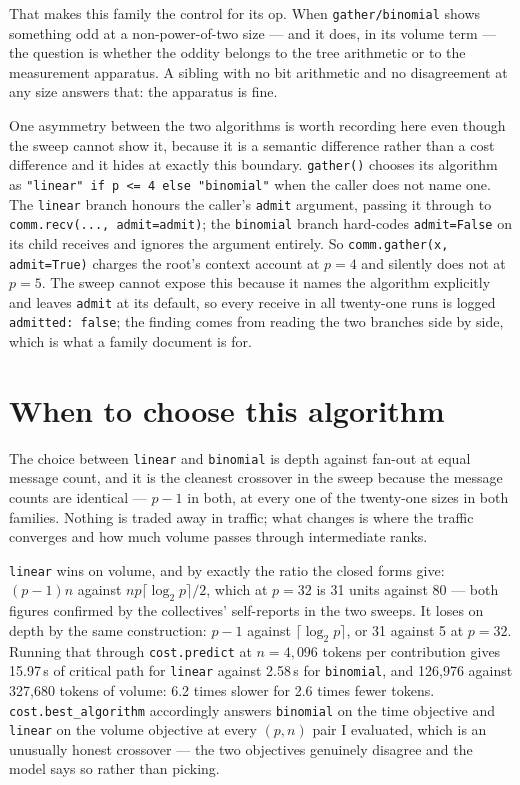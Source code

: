 \documentclass[11pt]{article}
\begin{document}
That makes this family the control for its op. When \texttt{gather/binomial} shows something odd
at a non-power-of-two size --- and it does, in its volume term --- the question is whether the
oddity belongs to the tree arithmetic or to the measurement apparatus. A sibling with no bit
arithmetic and no disagreement at any size answers that: the apparatus is fine.

One asymmetry between the two algorithms is worth recording here even though the sweep cannot
show it, because it is a semantic difference rather than a cost difference and it hides at
exactly this boundary. \texttt{gather()} chooses its algorithm as
\texttt{"linear" if p <= 4 else "binomial"} when the caller does not name one. The
\texttt{linear} branch honours the caller's \texttt{admit} argument, passing it through to
\texttt{comm.recv(..., admit=admit)}; the \texttt{binomial} branch hard-codes
\texttt{admit=False} on its child receives and ignores the argument entirely. So
\texttt{comm.gather(x, admit=True)} charges the root's context account at $p=4$ and silently does
not at $p=5$. The sweep cannot expose this because it names the algorithm explicitly and leaves
\texttt{admit} at its default, so every receive in all twenty-one runs is logged
\texttt{admitted: false}; the finding comes from reading the two branches side by side, which is
what a family document is for.

\section{When to choose this algorithm}

The choice between \texttt{linear} and \texttt{binomial} is depth against fan-out at equal
message count, and it is the cleanest crossover in the sweep because the message counts are
identical --- $p-1$ in both, at every one of the twenty-one sizes in both families. Nothing is
traded away in traffic; what changes is where the traffic converges and how much volume passes
through intermediate ranks.

\texttt{linear} wins on volume, and by exactly the ratio the closed forms give: $(p-1)n$ against
$np\lceil\log_2 p\rceil/2$, which at $p=32$ is 31 units against 80 --- both figures confirmed by
the collectives' self-reports in the two sweeps. It loses on depth by the same construction:
$p-1$ against $\lceil\log_2 p\rceil$, or 31 against 5 at $p=32$. Running that through
\texttt{cost.predict} at $n = 4{,}096$ tokens per contribution gives 15.97\,s of critical path
for \texttt{linear} against 2.58\,s for \texttt{binomial}, and 126,976 against 327,680 tokens of
volume: 6.2 times slower for 2.6 times fewer tokens. \texttt{cost.best\_algorithm} accordingly
answers \texttt{binomial} on the time objective and \texttt{linear} on the volume objective at
every $(p, n)$ pair I evaluated, which is an unusually honest crossover --- the two objectives
genuinely disagree and the model says so rather than picking.
\end{document}
